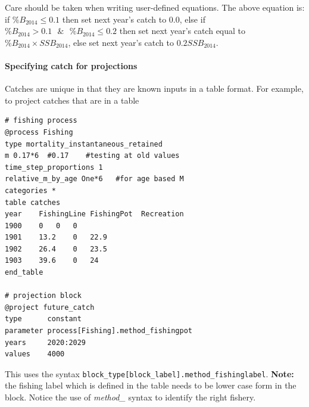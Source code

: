 Care should be taken when writing user-defined equations. The above equation is: if $\%B_{2014} \leq 0.1$ then set next year's catch to 0.0, else if $\%B_{2014} > 0.1 \text{ } \& \text{ } \%B_{2014} \leq 0.2$ then set next year's catch equal to $\%B_{2014} \times SSB_{2014}$, else set next year's catch to $0.2 SSB_{2014}$.

\paragraph[Catches]{Specifying catch for projections }\label{sec:Project-Catch}

Catches are unique in that they are known inputs in a table format. For example, to project catches that are in a table

{\small{\begin{verbatim}
# fishing process
@process Fishing
type mortality_instantaneous_retained
m 0.17*6  #0.17    #testing at old values
time_step_proportions 1
relative_m_by_age One*6   #for age based M
categories *
table catches
year	FishingLine	FishingPot	Recreation
1900	0	0	0
1901	13.2	0	22.9
1902	26.4	0	23.5
1903	39.6	0	24
end_table

# projection block
@project future_catch
type      constant
parameter process[Fishing].method_fishingpot
years     2020:2029
values    4000
\end{verbatim}}}

This uses the syntax \texttt{block\_type[block\_label].method\_fishinglabel}. \textbf{Note:} the fishing label which is defined in the table needs to be lower case form in the  block. Notice the use of \textit{method\_} syntax to identify the right fishery.
